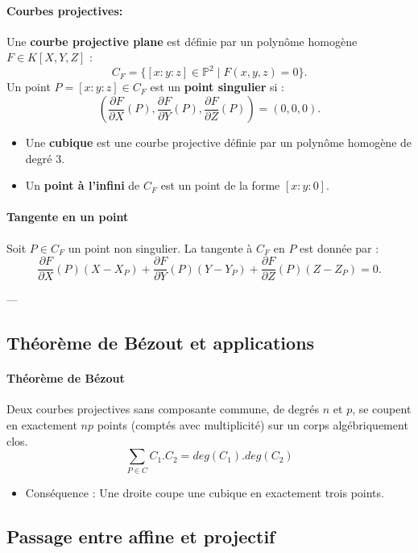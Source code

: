\documentclass[12pt,a4paper]{article}
\begin{document}
	\paragraph{Courbes projectives:}
	Une \textbf{courbe projective plane} est définie par un polynôme homogène $F \in K[X, Y, Z]$ :
	\[
	C_F = \{[x : y : z] \in \mathbb{P}^2 \mid F(x, y, z) = 0\}.
	\]
	Un point $P = [x : y : z] \in C_F$ est un \textbf{point singulier} si :
	\[
	\left(\frac{\partial F}{\partial X}(P), \frac{\partial F}{\partial Y}(P), \frac{\partial F}{\partial Z}(P)\right) = (0, 0, 0).
	\]
	
	\begin{itemize}
		\item Une \textbf{cubique} est une courbe projective définie par un polynôme homogène de degré 3.
		\item Un \textbf{point à l’infini} de $C_F$ est un point de la forme $[x : y : 0]$.
	\end{itemize}
	
	\paragraph{Tangente en un point}
	Soit $P \in C_F$ un point non singulier. La tangente à $C_F$ en $P$ est donnée par :
	\[
	\frac{\partial F}{\partial X}(P)(X - X_P) + \frac{\partial F}{\partial Y}(P)(Y - Y_P) + \frac{\partial F}{\partial Z}(P)(Z - Z_P) = 0.
	\]
	
	---
	
	\subsection{Théorème de Bézout et applications}
	
	\paragraph{Théorème de Bézout}
	Deux courbes projectives sans composante commune, de degrés $n$ et $p$, se coupent en exactement $np$ points (comptés avec multiplicité) sur un corps algébriquement clos.
	\[
		\sum_{P \in C} C_1 . C_2 = deg(C_1).deg(C_2) 
	\]
	\begin{itemize}
		\item Conséquence : Une droite coupe une cubique en exactement trois points.
	\end{itemize}
	
	\subsection{Passage entre affine et projectif}
	
\end{document}

